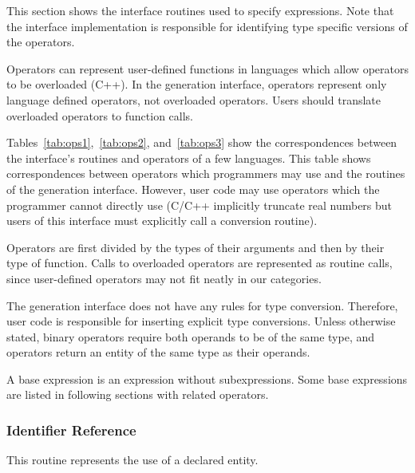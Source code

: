 
\label{sec:op}

This section shows the interface routines used to specify expressions.
Note that the interface implementation is responsible for identifying
type specific versions of the operators.

Operators can represent user-defined functions in languages which
allow operators to be overloaded (\eg C++).  In the generation
interface, operators represent only language defined operators, not
overloaded operators.  Users should translate overloaded operators to
function calls.

Tables~\ref{tab:ops1},~\ref{tab:ops2}, and~\ref{tab:ops3} show the
correspondences between the interface's routines and operators of a few
languages.  This table shows correspondences between operators which
programmers may use and the routines of the generation interface.
However, user code may use operators which the programmer cannot
directly use (\eg C/C++ implicitly truncate real numbers but users of
this interface must explicitly call a conversion routine).



Operators are first divided by the types of their arguments and then
by their type of function.  Calls to overloaded operators are
represented as routine calls, since user-defined operators may not fit
neatly in our categories.  

The generation interface does not have any rules for type conversion.
Therefore, user code is responsible for inserting explicit type
conversions.  Unless otherwise stated, binary operators require both
operands to be of the same type, and operators return an entity of the
same type as their operands.


A base expression is an expression without subexpressions.  Some base
expressions are listed in following sections with related operators.

\subsubsection{Identifier Reference}
\begin{functionality}
This routine represents the use of a declared entity.
\end{functionality}

